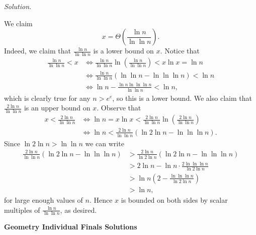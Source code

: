 \documentclass[10pt]{article}
\newcommand{\solution}
{
\vspace{3pt}
\noindent\textit{Solution.}\qquad
}
\begin{document}
\begin{enumerate}
\solution
We claim
\[x = \boxed{\Theta\left(\frac{\ln n}{\ln \ln n}\right)}.\]
Indeed, we claim that $\frac{\ln n}{\ln \ln n}$ is a lower bound on $x$. Notice that
\begin{align*}
\frac{\ln n}{\ln \ln n} < x & \iff \frac{\ln n}{\ln \ln n}\ln \left(\frac{\ln n}{\ln \ln n}\right) < x\ln x = \ln n \\
& \iff \frac{\ln n}{\ln \ln n}\left(\ln\ln n - \ln\ln\ln n\right) < \ln n \\
& \iff \ln n - \frac{\ln n \ln\ln\ln n}{\ln\ln n} < \ln n,
\end{align*}
which is clearly true for any $n > e^e$, so this is a lower bound. We also claim that $\frac{2\ln n}{\ln \ln n}$ is an upper bound on $x$. Observe that
\begin{align*}
x < \frac{2\ln n}{\ln \ln n} & \iff \ln n = x \ln x < \frac{2\ln n}{\ln \ln n} \ln \left(\frac{2\ln n}{\ln \ln n}\right) \\
& \iff \ln n < \frac{2 \ln n}{\ln \ln n} \left(\ln 2 \ln n - \ln \ln \ln n\right).
\end{align*}
Since $\ln 2 \ln n > \ln \ln n$ we can write
\begin{align*}
\frac{2 \ln n}{\ln \ln n} \left(\ln 2 \ln n - \ln \ln \ln n\right) & > \frac{2 \ln n}{\ln 2 \ln n} \left(\ln 2 \ln n - \ln \ln \ln n\right) \\
& > 2 \ln n - \ln n \cdot \frac{2 \ln \ln \ln n}{\ln 2 \ln n} \\
& > \ln n \left(2 - \frac{\ln \ln \ln n}{\ln 2 \ln n}\right) \\
& > \ln n,
\end{align*}
for large enough values of $n$. Hence $x$ is bounded on both sides by scalar multiples of $\frac{\ln n}{\ln \ln n}$, as desired.

\end{enumerate}

\newpage

\begin{center}
\huge\textbf{Geometry Individual Finals Solutions}
\end{center} \vspace{3pt}
\end{document}
